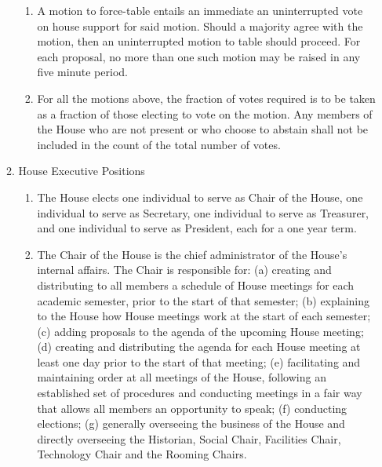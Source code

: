 \documentclass[letterpaper]{article}
\begin{document}
\begin{enumerate}
\begin{enumerate}
\begin{enumerate}
\item A motion to force-table entails an immediate an uninterrupted vote on house support for said motion. Should a majority agree with the motion, then an uninterrupted motion to table should proceed. For each proposal, no more than one such motion may be raised in any five minute period.

\item For all the motions above, the fraction of votes required is to be taken as a fraction of those electing to vote on the motion. Any members of the House who are not present or who choose to abstain shall not be included in the count of the total number of votes.

\end{enumerate}

\item House Executive Positions

\begin{enumerate}

\item The House elects one individual to serve as Chair of the House, one individual to serve as Secretary, one individual to serve as Treasurer, and one individual to serve as President, each for a one year term.

\item The Chair of the House is the chief administrator of the House's internal affairs. The Chair is responsible for: (a) creating and distributing to all members a schedule of House meetings for each academic semester, prior to the start of that semester; (b) explaining to the House how House meetings work at the start of each semester; (c) adding proposals to the agenda of the upcoming House meeting; (d) creating and distributing the agenda for each House meeting at least one day prior to the start of that meeting; (e) facilitating and maintaining order at all meetings of the House, following an established set of procedures and conducting meetings in a fair way that allows all members an opportunity to speak; (f) conducting elections; (g) generally overseeing the business of the House and directly overseeing the Historian, Social Chair, Facilities Chair, Technology Chair and the Rooming Chairs.


\end{enumerate}
\end{enumerate}
\end{enumerate}
\end{document}
